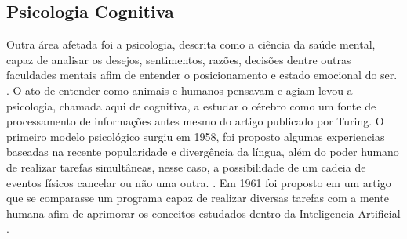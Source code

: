 \subsection{Psicologia Cognitiva}
Outra área afetada foi a psicologia, descrita como a ciência da saúde mental, capaz de analisar os desejos, sentimentos, razões, decisões dentre outras faculdades mentais afim de entender o posicionamento e estado emocional do ser. \cite[4-6]{william1890principles}. O ato de entender como animais e humanos pensavam e agiam levou a psicologia, chamada aqui de cognitiva, a estudar o cérebro como um fonte de processamento de informações antes mesmo do artigo publicado por Turing. O primeiro modelo psicológico surgiu em 1958, foi proposto algumas experiencias baseadas na recente popularidade e divergência da língua, além do poder humano de realizar tarefas simultâneas, nesse caso, a possibilidade de um cadeia de eventos físicos cancelar ou não uma outra. \cite[4-7]{broadbent1958perception}. Em 1961 foi proposto em um artigo que se comparasse um programa capaz de realizar diversas tarefas com a mente humana afim de aprimorar os conceitos estudados dentro da Inteligencia Artificial \cite[110]{newell1961gps}.